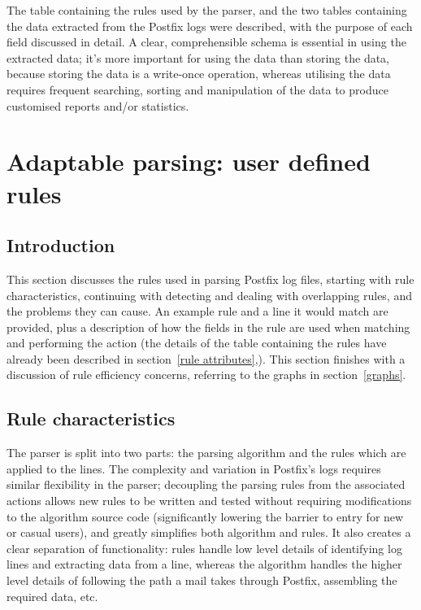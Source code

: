 \documentclass[a4paper,12pt,draft]{article}
\begin{document}
The table containing the rules used by the parser, and the two tables
containing the data extracted from the Postfix logs were described, with
the purpose of each field discussed in detail.  A clear, comprehensible
schema is essential in using the extracted data; it's more important for
using the data than storing the data, because storing the data is a
write-once operation, whereas utilising the data requires frequent
searching, sorting and manipulation of the data to produce customised
reports and/or statistics.

\section{Adaptable parsing: user defined rules}

\label{rules}

\subsection{Introduction}

This section discusses the rules used in parsing Postfix log files,
starting with rule characteristics, continuing with detecting and dealing
with overlapping rules, and the problems they can cause.  An example rule
and a line it would match are provided, plus a description of how the
fields in the rule are used when matching and performing the action (the
details of the table containing the rules have already been described in
section~\ref{rule attributes},).  This section finishes with a discussion
of rule efficiency concerns, referring to the graphs in
section~\ref{graphs}.


\subsection{Rule characteristics}

\label{rule characteristics}

The parser is split into two parts: the parsing algorithm and the rules
which are applied to the lines.  The complexity and variation in Postfix's
logs requires similar flexibility in the parser; decoupling the parsing
rules from the associated actions allows new rules to be written and tested
without requiring modifications to the algorithm source code (significantly
lowering the barrier to entry for new or casual users), and greatly
simplifies both algorithm and rules.  It also creates a clear separation of
functionality: rules handle low level details of identifying log lines and
extracting data from a line, whereas the algorithm handles the higher level
details of following the path a mail takes through Postfix, assembling the
required data, etc.
\end{document}
